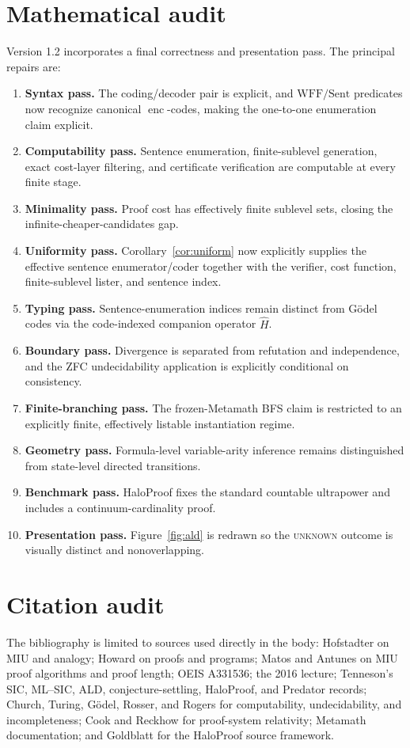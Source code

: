 \documentclass[11pt,oneside]{book}
\theoremstyle{definition}
\theoremstyle{remark}
\newcommand{\enc}{\operatorname{enc}}
\begin{document}
\section{Mathematical audit}
Version 1.2 incorporates a final correctness and presentation pass. The principal repairs are:
\begin{enumerate}
\item \textbf{Syntax pass.} The coding/decoder pair is explicit, and $\mathrm{WFF}/\mathrm{Sent}$ predicates now recognize canonical $\enc$-codes, making the one-to-one enumeration claim explicit.
\item \textbf{Computability pass.} Sentence enumeration, finite-sublevel generation, exact cost-layer filtering, and certificate verification are computable at every finite stage.
\item \textbf{Minimality pass.} Proof cost has effectively finite sublevel sets, closing the infinite-cheaper-candidates gap.
\item \textbf{Uniformity pass.} Corollary~\ref{cor:uniform} now explicitly supplies the effective sentence enumerator/coder together with the verifier, cost function, finite-sublevel lister, and sentence index.
\item \textbf{Typing pass.} Sentence-enumeration indices remain distinct from G\"odel codes via the code-indexed companion operator $\widehat H$.
\item \textbf{Boundary pass.} Divergence is separated from refutation and independence, and the ZFC undecidability application is explicitly conditional on consistency.
\item \textbf{Finite-branching pass.} The frozen-Metamath BFS claim is restricted to an explicitly finite, effectively listable instantiation regime.
\item \textbf{Geometry pass.} Formula-level variable-arity inference remains distinguished from state-level directed transitions.
\item \textbf{Benchmark pass.} HaloProof fixes the standard countable ultrapower and includes a continuum-cardinality proof.
\item \textbf{Presentation pass.} Figure~\ref{fig:ald} is redrawn so the \textsc{unknown} outcome is visually distinct and nonoverlapping.
\end{enumerate}

\section{Citation audit}
The bibliography is limited to sources used directly in the body: Hofstadter on MIU and analogy; Howard on proofs and programs; Matos and Antunes on MIU proof algorithms and proof length; OEIS A331536; the 2016 lecture; Tenneson's SIC, ML--SIC, ALD, conjecture-settling, HaloProof, and Predator records; Church, Turing, G\"odel, Rosser, and Rogers for computability, undecidability, and incompleteness; Cook and Reckhow for proof-system relativity; Metamath documentation; and Goldblatt for the HaloProof source framework.
\end{document}
